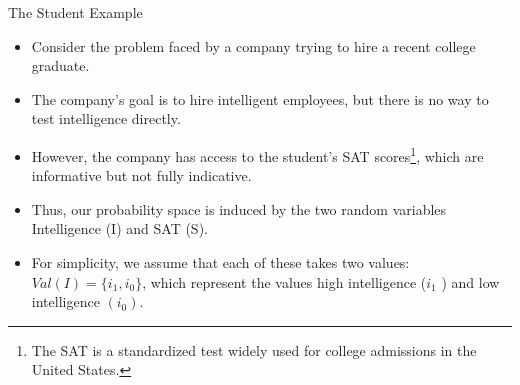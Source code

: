 \documentclass[handout]{beamer}
\begin{document}
\begin{frame}{The Student Example}
\scriptsize{
\begin{itemize}


\item Consider the problem faced by a company trying to hire a recent college graduate. 
\item The company's goal is to hire intelligent employees, but there is no way to test intelligence directly. 

\item However, the company has access to the student's SAT scores\footnote{The SAT is a standardized test widely used for college admissions in the United States.}, which are informative but not fully indicative. 

\item Thus, our probability space is induced by the two random variables Intelligence (I) and SAT (S). 
\item For simplicity, we assume that each of these takes two values: $Val(I) = \{i_1 , i_0 \}$, which represent
the values high intelligence ($i_1$ ) and low intelligence $(i_0)$.


\end{itemize}



} 

\end{frame}
\end{document}

